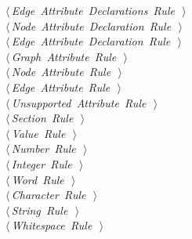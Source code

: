 \documentclass[a4paper]{report}
\begin{document}
\begin{flushleft}
\begin{minipage}{\linewidth}
\begin{list}{}{}
\mbox{}\verb@@\hbox{$\langle\,${\itshape Edge Attribute Declarations Rule}\nobreak\ {\footnotesize {}}$\,\rangle$}\verb@@\\
\mbox{}\verb@@\hbox{$\langle\,${\itshape Node Attribute Declaration Rule}\nobreak\ {\footnotesize {}}$\,\rangle$}\verb@@\\
\mbox{}\verb@@\hbox{$\langle\,${\itshape Edge Attribute Declaration Rule}\nobreak\ {\footnotesize {}}$\,\rangle$}\verb@@\\
\mbox{}\verb@@\hbox{$\langle\,${\itshape Graph Attribute Rule}\nobreak\ {\footnotesize {}}$\,\rangle$}\verb@@\\
\mbox{}\verb@@\hbox{$\langle\,${\itshape Node Attribute Rule}\nobreak\ {\footnotesize {}}$\,\rangle$}\verb@@\\
\mbox{}\verb@@\hbox{$\langle\,${\itshape Edge Attribute Rule}\nobreak\ {\footnotesize {}}$\,\rangle$}\verb@@\\
\mbox{}\verb@@\hbox{$\langle\,${\itshape Unsupported Attribute Rule}\nobreak\ {\footnotesize {}}$\,\rangle$}\verb@@\\
\mbox{}\verb@@\hbox{$\langle\,${\itshape Section Rule}\nobreak\ {\footnotesize {}}$\,\rangle$}\verb@@\\
\mbox{}\verb@@\hbox{$\langle\,${\itshape Value Rule}\nobreak\ {\footnotesize {}}$\,\rangle$}\verb@@\\
\mbox{}\verb@@\hbox{$\langle\,${\itshape Number Rule}\nobreak\ {\footnotesize {}}$\,\rangle$}\verb@@\\
\mbox{}\verb@@\hbox{$\langle\,${\itshape Integer Rule}\nobreak\ {\footnotesize {}}$\,\rangle$}\verb@@\\
\mbox{}\verb@@\hbox{$\langle\,${\itshape Word Rule}\nobreak\ {\footnotesize {}}$\,\rangle$}\verb@@\\
\mbox{}\verb@@\hbox{$\langle\,${\itshape Character Rule}\nobreak\ {\footnotesize {}}$\,\rangle$}\verb@@\\
\mbox{}\verb@@\hbox{$\langle\,${\itshape String Rule}\nobreak\ {\footnotesize {}}$\,\rangle$}\verb@@\\
\mbox{}\verb@@\hbox{$\langle\,${\itshape Whitespace Rule}\nobreak\ {\footnotesize {}}$\,\rangle$}\verb@@\\
\mbox{}\verb@@{\NWsep}
\end{list}
\vspace{-1.5ex}
\footnotesize
\begin{list}{}{\setlength{\itemsep}{-\parsep}\setlength{\itemindent}{-\leftmargin}}

\item{}
\end{list}
\end{minipage}\vspace{4ex}
\end{flushleft}
\end{document}
